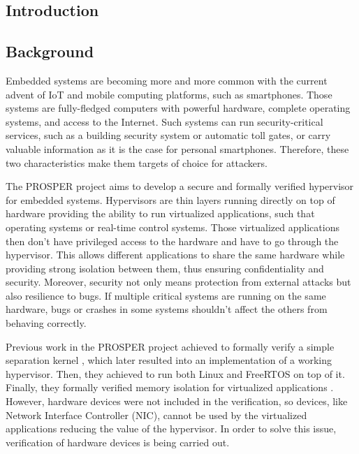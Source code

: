 \documentclass[10pt,a4paper]{article}
\begin{document}
\begin{multicols}{2}


\section{Introduction}

\subsection{Background}

Embedded systems are becoming more and more common with the current advent of {IoT} and mobile computing platforms, such as smartphones. Those systems are fully-fledged computers with powerful hardware, complete operating systems, and access to the Internet. Such systems can run security-critical services, such as a building security system or automatic toll gates, or carry valuable information as it is the case for personal smartphones. Therefore, these two characteristics make them targets of choice for attackers.

The {PROSPER} project \cite{noauthor_prosper:_nodate-1} aims to develop a secure and formally verified hypervisor for embedded systems. Hypervisors are thin layers running directly on top of hardware providing the ability to run virtualized applications, such that operating systems or real-time control systems. Those virtualized applications then don't have privileged access to the hardware and have to go through the hypervisor. This allows different applications to share the same hardware while providing strong isolation between them, thus ensuring confidentiality and security. Moreover, security not only means protection from external attacks but also resilience to bugs. If multiple critical systems are running on the same hardware, bugs or crashes in some systems shouldn't affect the others from behaving correctly.

Previous work in the {PROSPER} project achieved to formally verify a simple separation kernel \cite{dam_formal_2013}, which later resulted into an implementation of a working hypervisor. Then, they achieved to run both Linux and {FreeRTOS} on top of it. Finally, they formally verified memory isolation for virtualized applications \cite{nemati_trustworthy_2015}. However, hardware devices were not included in the verification, so devices, like Network Interface Controller ({NIC}), cannot be used by the virtualized applications reducing the value of the hypervisor. In order to solve this issue, verification of hardware devices is being carried out.


\end{multicols}
\end{document}
